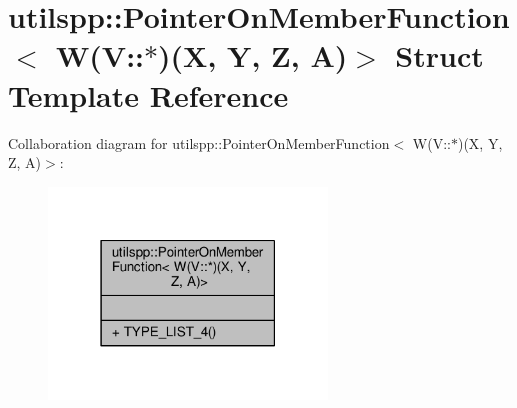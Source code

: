 \hypertarget{structutilspp_1_1PointerOnMemberFunction_3_01W_07V_1_1_5_08_07X_00_01Y_00_01Z_00_01A_08_4}{\section{utilspp\-:\-:Pointer\-On\-Member\-Function$<$ W(V\-:\-:$\ast$)(X, Y, Z, A)$>$ Struct Template Reference}
\label{structutilspp_1_1PointerOnMemberFunction_3_01W_07V_1_1_5_08_07X_00_01Y_00_01Z_00_01A_08_4}
}


Collaboration diagram for utilspp\-:\-:Pointer\-On\-Member\-Function$<$ W(V\-:\-:$\ast$)(X, Y, Z, A)$>$\-:\nopagebreak
\begin{figure}[H]
\begin{center}
\leavevmode
\includegraphics[width=210pt]{structutilspp_1_1PointerOnMemberFunction_3_01W_07V_1_1_5_08_07X_00_01Y_00_01Z_00_01A_08_4__coll__graph}
\end{center}
\end{figure}
